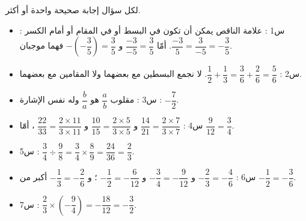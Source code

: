 \documentclass[12pt,a4paper]{article}
\begin{document}
\begin{corr}[title={أسئلة متعددة الخيارات}, stars=1, source={Axiomaths}]
لكل سؤال إجابة صحيحة واحدة أو أكثر.
\begin{qcm}
\end{qcm}
\axsol
{}
\begin{itemize}[itemsep=8pt]
  \item س1 : علامة الناقص يمكن أن تكون في البسط أو في المقام أو أمام الكسر : $\dfrac{-3}{5}=\dfrac{3}{-5}=-\dfrac{3}{5}$.
        أمّا $\dfrac{-3}{-5}=\dfrac{3}{5}$ و $-\left(-\dfrac{3}{5}\right)=\dfrac{3}{5}$ فهما موجبان.
  \item س2 : $\dfrac{1}{2}+\dfrac{1}{3}=\dfrac{3}{6}+\dfrac{2}{6}=\dfrac{5}{6}$. لا نجمع البسطين مع بعضهما ولا المقامين مع بعضهما.
  \item س3 : مقلوب $\dfrac{a}{b}$ هو $\dfrac{b}{a}$ وله نفس الإشارة : $-\dfrac{7}{2}$.
  \item س4 : $\dfrac{14}{21}=\dfrac{2\times7}{3\times7}$ و $\dfrac{10}{15}=\dfrac{2\times5}{3\times5}$ و $\dfrac{22}{33}=\dfrac{2\times11}{3\times11}$ ، أمّا $\dfrac{9}{12}=\dfrac{3}{4}$.
  \item س5 : $\dfrac{3}{4}\div\dfrac{9}{8}=\dfrac{3}{4}\times\dfrac{8}{9}=\dfrac{24}{36}=\dfrac{2}{3}$.
  \item س6 : $-\dfrac{2}{3}=-\dfrac{4}{6}$ و $-\dfrac{3}{4}=-\dfrac{9}{12}$ و $-\dfrac{1}{2}=-\dfrac{6}{12}$ ؛ و $-\dfrac{1}{3}=-\dfrac{2}{6}$ أكبر من $-\dfrac{1}{2}=-\dfrac{3}{6}$.
  \item س7 : $\dfrac{2}{3}\times\left(-\dfrac{9}{4}\right)=-\dfrac{18}{12}=-\dfrac{3}{2}$.
\end{itemize}
\end{corr}
\end{document}
